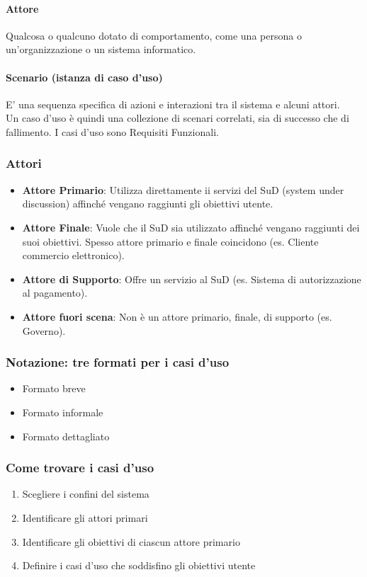 \documentclass[12pt]{article}
\begin{document}
\paragraph{Attore} Qualcosa o qualcuno dotato di comportamento, come una persona o un'organizzazione o un sistema informatico.
\paragraph{Scenario (istanza di caso d'uso)} E' una sequenza specifica di azioni e interazioni tra il sistema e alcuni attori.
\\[12pt]
\noindent Un caso d'uso è quindi una collezione di scenari correlati, sia di successo che di fallimento. I casi d'uso sono Requisiti Funzionali.
\subsubsection{Attori}
\begin{itemize}
    \item \textbf{Attore Primario}: Utilizza direttamente ii servizi del SuD (system under discussion) affinché vengano raggiunti gli obiettivi utente.
    \item \textbf{Attore Finale}: Vuole che il SuD sia utilizzato affinché vengano raggiunti dei suoi obiettivi. Spesso attore primario e finale coincidono (es. Cliente commercio elettronico).
    \item \textbf{Attore di Supporto}: Offre un servizio al SuD (es. Sistema di autorizzazione al pagamento).
    \item \textbf{Attore fuori scena}: Non è un attore primario, finale, di supporto (es. Governo). 
\end{itemize}
\subsubsection{Notazione: tre formati per i casi d'uso}
\begin{itemize}
    \item Formato breve
    \item Formato informale
    \item Formato dettagliato
\end{itemize}
\subsubsection{Come trovare i casi d'uso}
\begin{enumerate}
    \item Scegliere i confini del sistema
    \item Identificare gli attori primari
    \item Identificare gli obiettivi di ciascun attore primario
    \item Definire i casi d'uso che soddisfino gli obiettivi utente
\end{enumerate}
\end{document}

